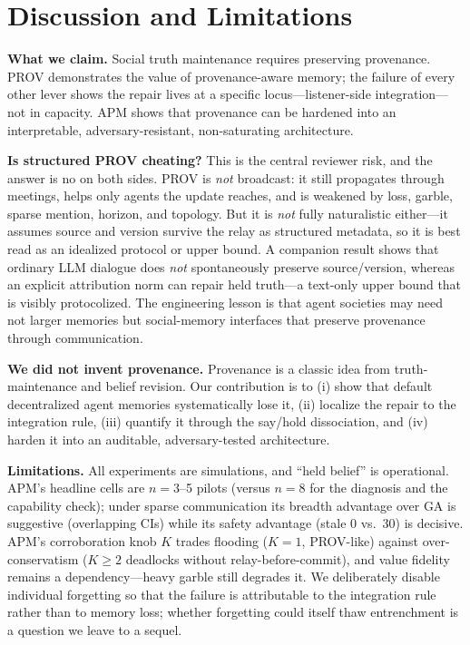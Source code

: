 \documentclass[letterpaper]{article} %
\begin{document}
\section{Discussion and Limitations}
\textbf{What we claim.} Social truth maintenance requires preserving provenance. PROV
demonstrates the value of provenance-aware memory; the failure of every other lever shows the
repair lives at a specific locus---listener-side integration---not in capacity. APM shows that
provenance can be hardened into an interpretable, adversary-resistant, non-saturating
architecture.

\textbf{Is structured PROV cheating?} This is the central reviewer risk, and the answer is no on
both sides. PROV is \emph{not} broadcast: it still propagates through meetings, helps only
agents the update reaches, and is weakened by loss, garble, sparse mention, horizon, and
topology. But it is \emph{not} fully naturalistic either---it assumes source and version survive
the relay as structured metadata, so it is best read as an idealized protocol or upper bound. A
companion result shows that ordinary LLM dialogue does \emph{not} spontaneously preserve
source/version, whereas an explicit attribution norm can repair held truth---a text-only upper
bound that is visibly protocolized. The engineering lesson is that agent societies may need not
larger memories but social-memory interfaces that preserve provenance through communication.

\textbf{We did not invent provenance.} Provenance is a classic idea from truth-maintenance and
belief revision. Our contribution is to (i) show that default decentralized agent memories
systematically lose it, (ii) localize the repair to the integration rule, (iii) quantify it
through the say/hold dissociation, and (iv) harden it into an auditable, adversary-tested
architecture.

\textbf{Limitations.} All experiments are simulations, and ``held belief'' is operational. APM's
headline cells are $n{=}3$--5 pilots (versus $n{=}8$ for the diagnosis and the capability check);
under sparse communication its breadth advantage over GA is suggestive (overlapping CIs) while
its safety advantage (stale 0 vs.\ 30) is decisive. APM's corroboration knob $K$ trades flooding
($K{=}1$, PROV-like) against over-conservatism ($K{\ge}2$ deadlocks without relay-before-commit),
and value fidelity remains a dependency---heavy garble still degrades it. We deliberately disable
individual forgetting so that the failure is attributable to the integration rule rather than to
memory loss; whether forgetting could itself thaw entrenchment is a question we leave to a
sequel.
\end{document}
